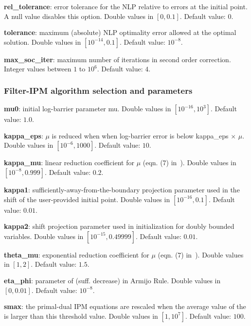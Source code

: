 \noindent \textbf{rel\_tolerance}: error tolerance for the NLP relative to errors at the initial point. A null value disables this option. Double values in $[0, 0.1]$. Default value: $0$.
\medskip

\noindent \textbf{tolerance}: maximum (absolute) NLP optimality error allowed at the optimal solution. Double values in $[10^{-14},0.1]$. Default value: $10^{-8}$. 
\medskip

\noindent \textbf{max\_soc\_iter}: maximum number of iterations in second order correction. Integer values between $1$ to $10^6$. Default value: $4$.
\medskip



\subsubsection{Filter-IPM algorithm selection and parameters}

\noindent \textbf{mu0}: initial log-barrier parameter mu. Double values in $[10^{-16},10^3]$. Default value: $1.0$. 
\medskip

\noindent \textbf{kappa\_eps}: $\mu$ is reduced when when log-barrier error is below kappa\_eps $\times$ $\mu$. Double values in $[10^{-6}, 1000]$. Default value: $10$.
\medskip

\noindent \textbf{kappa\_mu}: linear reduction coefficient for $\mu$ (eqn. (7) in~\cite{waecther_05_ipopt0}). Double values in $[10^{-8},0.999]$. Default value: $0.2$.
\medskip

\noindent \textbf{kappa1}: sufficiently-away-from-the-boundary projection parameter used in the shift of the user-provided initial point. Double values in $[10^{-16},0.1]$. Default value: $0.01$.
\medskip

\noindent \textbf{kappa2}: shift projection parameter used in initialization for doubly bounded variables. Double values in $[10^{-15},0.49999]$. Default value: $0.01$.
\medskip

\noindent \textbf{theta\_mu}: exponential reduction coefficient for $\mu$ (eqn. (7) in~\cite{waecther_05_ipopt0}). Double values in $[1, 2]$. Default value: $1.5$.
\medskip


\noindent \textbf{eta\_phi}: parameter of (suff. decrease) in Armijo Rule. Double values in $[ 0, 0.01]$. Default value: $10^{-8}$.
\medskip

\noindent \textbf{smax}: the primal-dual IPM equations are rescaled when the average value of the is larger than this threshold value. Double values in $[1,10^7]$. Default value: $100$.
\medskip

